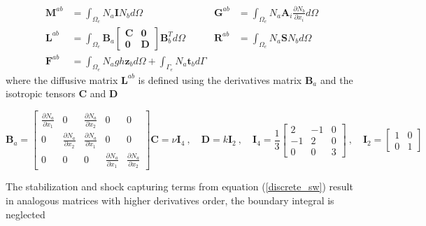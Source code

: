 \documentclass[a4paper,12pt]{article}
\newcommand{\pder}[2]{\frac{\partial#1}{\partial#2}}
\begin{document}
\begin{align}
    \displaystyle \mathbf{M}^{ab} &= \int_{\Omega_e}N_a \mathbf{I} N_b d\Omega &
    \displaystyle \mathbf{G}^{ab} &= \int_{\Omega_e}
        N_a \mathbf{A}_i \pder{N_b}{x_i} d\Omega \nonumber\\[5pt]
    \displaystyle \mathbf{L}^{ab} &= \int_{\Omega_e}
        \mathbf{B}_a \left[\begin{matrix}
            \mathbf{C} & \mathbf{0} \\ \mathbf{0} & \mathbf{D}
        \end{matrix}\right] \mathbf{B}_b^T d\Omega &
    \displaystyle \mathbf{R}^{ab} &= \int_{\Omega_e} N_a \mathbf{S} N_b d\Omega \\[5pt]
    \displaystyle \mathbf{F}^{ab} &= \int_{\Omega_e} N_a gh\mathbf{z}_b d\Omega +
        \int_{\Gamma_e} N_a \mathbf{t}_b d\Gamma \nonumber
\end{align}
where the diffusive matrix $\mathbf{L}^{ab}$ is defined using the derivatives matrix $\mathbf{B}_a$ and the isotropic tensors $\mathbf{C}$ and $\mathbf{D}$

\begin{subequations}
\begin{equation}
\mathbf{B}_a = \left[\begin{matrix}
    \pder{N_a}{x_1} & 0 & \pder{N_a}{x_2} & 0 & 0 \\
    0 & \pder{N_a}{x_2} & \pder{N_a}{x_1} & 0 & 0 \\
    0 & 0 & 0 & \pder{N_a}{x_1} & \pder{N_a}{x_2}
\end{matrix}\right]
\end{equation}
\begin{equation}
\mathbf{C} = \nu \mathbf{I}_4 \ , \quad
\mathbf{D} = k \mathbf{I}_2 \ , \quad
\mathbf{I}_4 = \frac{1}{3} \left[\begin{matrix}
        2 & -1 & 0 \\
        -1 & 2 & 0 \\
        0 & 0 & 3
    \end{matrix}\right] \ , \quad
\mathbf{I}_2 = \left[\begin{matrix}
        1 & 0 \\
        0 & 1
    \end{matrix}\right]
\end{equation}
\end{subequations}

The stabilization and shock capturing terms from equation (\ref{discrete_sw}) result in analogous matrices with higher derivatives order, the boundary integral is neglected
\end{document}
